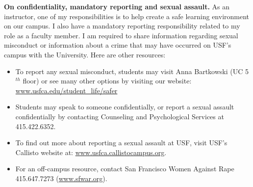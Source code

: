 \documentclass[11pt]{article}
\begin{document}
\noindent \textbf{On confidentiality, mandatory reporting and sexual assault.} As an instructor, one of my responsibilities is to help create a safe learning environment on our campus. I also have a mandatory reporting responsibility related to my role as a faculty member. I am required to share information regarding sexual misconduct or information about a crime that may have occurred on USF's campus with the University. Here are other resources:
\begin{itemize}
\item To report any sexual misconduct, students may visit Anna Bartkowski (UC 5$^{th}$ floor) or see many other options by visiting our website: \url{www.usfca.edu/student_life/safer}
\item Students may speak to someone confidentially, or report a sexual assault confidentially by contacting Counseling and Psychological Services at 415.422.6352. 
\item To find out more about reporting a sexual assault at USF, visit USF's Callisto website at: \url{www.usfca.callistocampus.org}.
\item For an off-campus resource, contact San Francisco Women Against Rape 415.647.7273 (\url{www.sfwar.org}).
\end{itemize}
\end{document}

